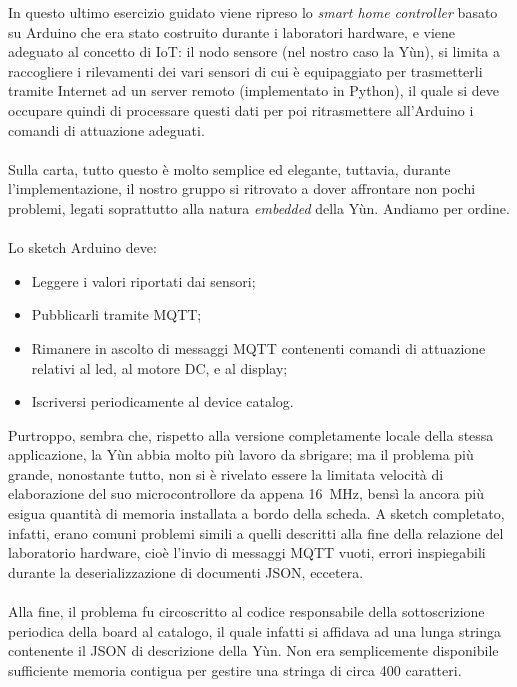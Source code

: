 \documentclass[12pt,a4paper]{article}
\begin{document}
In questo ultimo esercizio guidato viene ripreso lo \textit{smart home controller} basato su Arduino che era stato costruito durante i laboratori hardware, e viene adeguato al concetto di IoT: il nodo sensore (nel nostro caso la Yùn), si limita a raccogliere i rilevamenti dei vari sensori di cui è equipaggiato per trasmetterli tramite Internet ad un server remoto (implementato in Python), il quale si deve occupare quindi di processare questi dati per poi ritrasmettere all'Arduino i comandi di attuazione adeguati.
\\ \\
Sulla carta, tutto questo è molto semplice ed elegante, tuttavia, durante l'implementazione, il nostro gruppo si ritrovato a dover affrontare non pochi problemi, legati soprattutto alla natura \textit{embedded} della Yùn. Andiamo per ordine.
\\ \\
Lo sketch Arduino deve:
\begin{itemize}
    \item Leggere i valori riportati dai sensori;
    \item Pubblicarli tramite MQTT;
    \item Rimanere in ascolto di messaggi MQTT contenenti comandi di attuazione relativi al led, al motore DC, e al display;
    \item Iscriversi periodicamente al device catalog.
\end{itemize}

Purtroppo, sembra che, rispetto alla versione completamente locale della stessa applicazione, la Yùn abbia molto più lavoro da sbrigare; ma il problema più grande, nonostante tutto, non si è rivelato essere la limitata velocità di elaborazione del suo microcontrollore da appena \SI{16}{\mega\hertz}, bensì la ancora più esigua quantità di memoria installata a bordo della scheda. A sketch completato, infatti, erano comuni problemi simili a quelli descritti alla fine della relazione del laboratorio hardware, cioè l'invio di messaggi MQTT vuoti, errori inspiegabili durante la deserializzazione di documenti JSON, eccetera.
\\ \\
Alla fine, il problema fu circoscritto al codice responsabile della sottoscrizione periodica della board al catalogo, il quale infatti si affidava ad una lunga stringa contenente il JSON di descrizione della Yùn. Non era semplicemente disponibile sufficiente memoria contigua per gestire una stringa di circa 400 caratteri.
\end{document}
